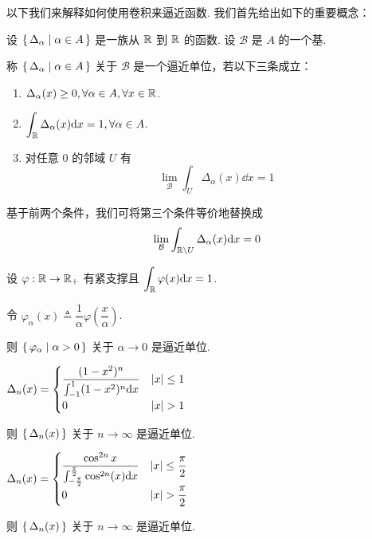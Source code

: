 
以下我们来解释如何使用卷积来逼近函数. 我们首先给出如下的重要概念：

\begin{definition}
    设 $\set{\Delta_\alpha|\alpha\in A}$ 是一族从 $\mathbb{R}$ 到 $\mathbb{R}$ 的函数. 设 $\mathcal{B}$ 是 $A$ 的一个基.

    称 $\set{\Delta_\alpha|\alpha\in A}$ 关于 $\mathcal{B}$ 是一个逼近单位，若以下三条成立：

    \begin{enumerate}
        \item $\Delta_\alpha(x)\ge 0,\forall\alpha\in A,\forall x\in\mathbb{R}$.
        
        \item $\displaystyle\int_{\mathbb{R}}\Delta_\alpha(x)\mathrm{d} x=1,\forall\alpha\in A$.
        
        \item 对任意 $0$ 的邻域 $U$ 有
$$
\lim_{\mathcal{B}}\int_U\Delta_\alpha(x)\dd x=1
$$
    \end{enumerate}
\end{definition}

\begin{hint}
    基于前两个条件，我们可将第三个条件等价地替换成
$$
\lim_{\mathcal{B}}\int_{\mathbb{R}\setminus U}\Delta_\alpha(x)\mathrm{d} x=0
$$
\end{hint}

\begin{example}
    设 $\varphi:\mathbb{R}\to\mathbb{R}_+$ 有紧支撑且 $\displaystyle\int_{\mathbb{R}}\varphi(x)\mathrm{d} x=1$.

    令 $\varphi_\alpha(x)\triangleq\dfrac{1}{\alpha}\varphi\left(\dfrac{x}{\alpha}\right)$.

    则 $\set{\varphi_\alpha|\alpha>0}$ 关于 $\alpha\to 0$ 是逼近单位.
\end{example}

\begin{example}
    $\Delta_n(x)=\begin{cases}
        \dfrac{(1-x^2)^n}{\int_{-1}^1(1-x^2)^n\mathrm{d} x} & \left\lvert{x}\right\rvert\le 1\\
        0 & \left\lvert{x}\right\rvert>1
    \end{cases}$

    则 $\set{\Delta_n(x)}$ 关于 $n\to\infty$ 是逼近单位.
\end{example}

\begin{example}
    $\Delta_n(x)=\begin{cases}
        \dfrac{\cos^{2n}x}{\int_{-\frac{\pi}{2}}^\frac{\pi}{2}\cos^{2n}(x)\mathrm{d} x} & \left\lvert{x}\right\rvert\le\dfrac{\pi}{2}\\
        0 & \left\lvert{x}\right\rvert>\dfrac{\pi}{2}
    \end{cases}$

    则 $\set{\Delta_n(x)}$ 关于 $n\to\infty$ 是逼近单位.
\end{example}

